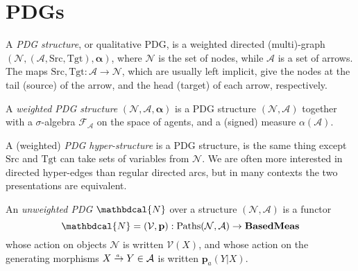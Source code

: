 \documentclass[twoside]{article} %
\theoremstyle{plain}
\theoremstyle{definition}
\newcommand{\BaseMeas}{\mathbf{BasedMeas}}
\newcommand{\mat}[1]{\mathbf{#1}}
\newcommand{\V}{\mathcal V}
\newcommand{\N}{\mathcal N}
\newcommand{\Ar}{\mathcal A}
\newcommand{\src}{\mathrm{Src}}
\newcommand{\tgt}{\mathrm{Tgt}}
\newcommand{\balpha}{\boldsymbol\alpha}
\newcommand{\dg}[1]{\mathbdcal{#1}}
\newcommand{\ed}[3]{#2%
    	  \overset{\smash{\mskip-5mu\raisebox{-1pt}{$\scriptscriptstyle
    	        #1$}}}{\rightarrow} #3}
\newcommand{\TODO}[1][INCOMPLETE]{{\centering\Large\color{red}$\langle$~\texttt{#1}~$\rangle$\par}}
\begin{document}
    

    \section{PDGs}
    \begin{defn}
        A \emph{PDG structure}, or qualitative PDG, is a weighted directed (multi)-graph $(\N, (\Ar, \src, \tgt), \balpha)$, where $\N$ is the set of nodes, while $\Ar$ is a set of arrows. The maps  $\src, \tgt: \Ar \to \N$, which are usually left implicit, give the nodes at the tail (source) of the arrow, and the head (target) of each arrow, respectively. 
    \end{defn}
    
    
    \begin{defn}
        A \emph{weighted PDG structure} $(\N, \Ar, \balpha)$ is a PDG structure $(\N, \Ar)$ together with a $\sigma$-algebra $\mathcal F_{\!\Ar}$ on the space of agents, and a (signed) measure $\alpha(\mathcal A)$.
        
    \end{defn}
    
    A  (weighted) \emph{PDG hyper-structure} is a PDG structure, is the same thing except $\src$ and $\tgt$ can take sets of variables from $\N$.
    We are often more interested in directed hyper-edges than regular directed arcs, but in many contexts the two presentations are equivalent.
    
    
    
    \begin{defn}
        An \emph{unweighted PDG} $\dg N$ over a structure $(\N, \Ar)$ is a functor
        \[ 
            {\dg N} = (\V, \mat p)  : \mathrm{Paths}(\N, \Ar) \to  \BaseMeas
        \] 
        whose action on objects $\N$ is written $\V(X)$, and whose action on the generating morphisms $\ed aXY \in \Ar$ is written $\mat p_a(Y|X)$.
    \end{defn}   
    
\end{document}
